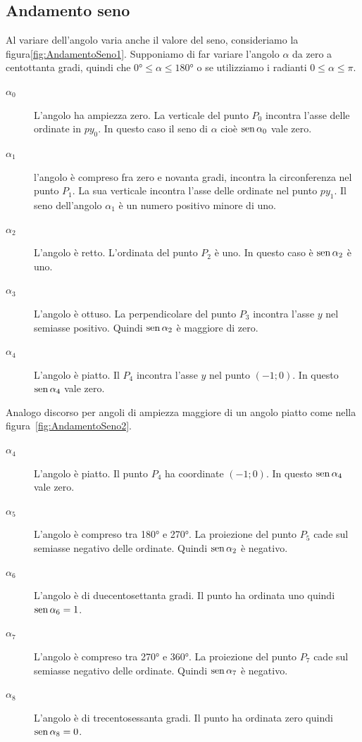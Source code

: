 \subsection{Andamento seno}
\label{subs:AndamentoSeno}
Al variare dell'angolo varia anche il valore del seno, consideriamo la figura\nobs\vref{fig:AndamentoSeno1}. Supponiamo di far variare l'angolo $\alpha$ da zero a centottanta gradi, quindi che $\ang{0}\leq\alpha\leq\ang{180}$ o se utilizziamo i radianti $0\leq\alpha\leq\pi$. 
\begin{description}
	\item[$\alpha_0$] L'angolo ha ampiezza zero. La verticale del punto $P_0$  incontra l'asse delle ordinate in $py_0$. In questo caso il seno di $\alpha$ cioè $\operatorname{sen}\alpha_0$ vale zero.
	\item [$\alpha_1$] l'angolo è compreso fra zero e novanta gradi, incontra la circonferenza nel punto $P_1$. La sua verticale incontra l'asse delle ordinate nel punto $py_1$. Il seno dell'angolo $\alpha_1$ è un numero positivo minore di uno.
	\item [$\alpha_2$] L'angolo  è retto. L'ordinata del punto $P_2$ è uno. In questo caso  è   $\operatorname{sen}\alpha_2$ è uno. 
	\item [$\alpha_3$]  L'angolo è ottuso. La perpendicolare del punto $P_3$ incontra  l'asse $y$ nel semiasse positivo. Quindi $\operatorname{sen}\alpha_2$ è maggiore di zero.
	\item [$\alpha_4$] L'angolo  è  piatto. Il  $P_4$ incontra l'asse $y$ nel punto $(-1;0)$. In questo  $\operatorname{sen}\alpha_4$ vale zero.
\end{description}
Analogo discorso per angoli di ampiezza  maggiore di un angolo  piatto come nella figura~\vref{fig:AndamentoSeno2}.
\begin{description}
	\item [$\alpha_4$] L'angolo è piatto. Il punto  $P_4$ ha coordinate  $(-1;0)$. In questo  $\operatorname{sen}\alpha_4$ vale zero.
	\item [$\alpha_5$] L'angolo è compreso tra \ang{180} e \ang{270}. La proiezione del punto $P_5$ cade sul semiasse negativo delle ordinate. Quindi $\operatorname{sen}\alpha_2$ è negativo.
	\item [$\alpha_6$] L'angolo è di duecentosettanta gradi. Il punto ha ordinata uno quindi  $\operatorname{sen}\alpha_6=1$.
	\item [$\alpha_7$] L'angolo è compreso tra \ang{270} e \ang{360}. La proiezione del punto $P_7$ cade sul semiasse negativo delle ordinate. Quindi $\operatorname{sen}\alpha_7$ è negativo.
	\item [$\alpha_8$] L'angolo è di trecentosessanta gradi. Il punto ha ordinata zero quindi  $\operatorname{sen}\alpha_8=0$.
\end{description}
